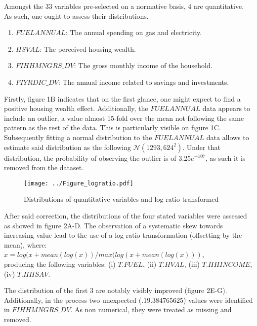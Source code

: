 \documentclass[12pt]{article}
\begin{document}
Amongst the 33 variables pre-selected on a normative basis, 4 are quantitative. As such, one ought to assess their distributions.

\begin{enumerate}
\item $FUELANNUAL$: The annual spending on gas and electricity.
\item $HSVAL$: The perceived housing wealth.
\item $FIHHMNGRS\_DV$: The gross monthly income of the household.
\item $FIYRDIC\_DV$: The annual income related to savings and investments.
\end{enumerate}

Firstly, figure 1B indicates that on the first glance, one might expect to find a positive housing wealth effect. Additionally, the $FUELANNUAL$ data appears to include an outlier, a value almost 15-fold over the mean not following the same pattern as the rest of the data. This is particularly visible on figure 1C. Subsequently fitting a normal distribution to the $FUELANNUAL$ data allows to estimate said distribution as the following $\mathcal{N}(1293,624^2)$. Under that distribution, the probability of observing the outlier is of $3.25e^{-107}$, as such it is removed from the dataset. \\

\begin{figure}[!h]
\begin{center}
\texttt{[image: ../Figure\_logratio.pdf]}
\end{center}
\caption{\footnotesize{Distributions of quantitative variables and log-ratio transformed}}
\label{Figure 2}
\end{figure}

After said correction, the distributions of the four stated variables were assessed as showed in figure 2A-D. The observation of a systematic skew towards increasing value lead to the use of a log-ratio transformation (offsetting by the mean), where:\\ 
$x=log(x+mean(log(x))/max(log(x+mean(log(x)))$,\\ 
producing the following variables: (i) $T.FUEL$, (ii) $T.HVAL$, (iii) $T.HHINCOME$, (iv) $T.HHSAV$.

The distribution of the first 3 are notably visibly improved (figure 2E-G). Additionally, in the process two unexpected ($.19.384765625$) values were identified in $FIHHMNGRS\_DV$. As non numerical, they were treated as missing and removed.
\end{document}
